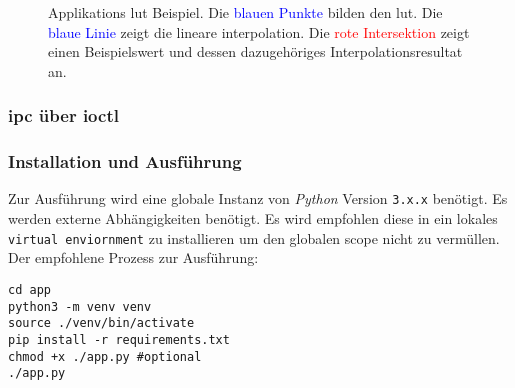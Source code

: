 \begin{figure}
    \centering
    \caption[Applikations \acrshort{lut} Beispiel]{Applikations \acrshort{lut} Beispiel. Die \textcolor{blue}{blauen Punkte} bilden den \gls{lut}. Die \textcolor{blue}{blaue Linie} zeigt die lineare interpolation. Die \textcolor{red}{rote Intersektion} zeigt einen Beispielswert und dessen dazugehöriges Interpolationsresultat an.}
    \label{fig:pcl}
\end{figure}

\subsubsection{\acrshort{ipc} über \acrshort{ioctl}}

\subsubsection{Installation und Ausführung}

Zur Ausführung wird eine globale Instanz von \textit{Python} Version \texttt{3.x.x} benötigt.
Es werden externe Abhängigkeiten benötigt.
Es wird empfohlen diese in ein lokales \texttt{virtual enviornment} zu installieren um den globalen scope nicht zu vermüllen.
Der empfohlene Prozess zur Ausführung:
\begin{lstlisting}
cd app
python3 -m venv venv
source ./venv/bin/activate
pip install -r requirements.txt
chmod +x ./app.py #optional
./app.py
\end{lstlisting}
